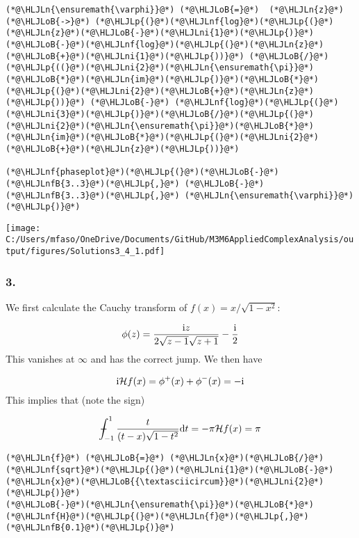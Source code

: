 \documentclass[12pt,a4paper]{article}
\newcommand{\HLJLn}[1]{#1}
\newcommand{\HLJLnf}[1]{\textcolor[RGB]{66,102,213}{#1}}
\newcommand{\HLJLnfB}[1]{\textcolor[RGB]{59,151,46}{#1}}
\newcommand{\HLJLni}[1]{\textcolor[RGB]{59,151,46}{#1}}
\newcommand{\HLJLoB}[1]{\textcolor[RGB]{102,102,102}{\textbf{#1}}}
\newcommand{\HLJLp}[1]{#1}
\def\D{ {\rm d} }
\def\I{ {\rm i} }
\def\HH{ {\cal H} }
\def\Xint#1{ \mathchoice
   {\XXint\displaystyle\textstyle{#1} }%
   {\XXint\textstyle\scriptstyle{#1} }%
   {\XXint\scriptstyle\scriptscriptstyle{#1} }%
   {\XXint\scriptscriptstyle\scriptscriptstyle{#1} }%
   \!\int}
\def\XXint#1#2#3{ {\setbox0=\hbox{$#1{#2#3}{\int}$}
     \vcenter{\hbox{$#2#3$}}\kern-.5\wd0} }
\def\dashint{\Xint-}
\def\dt{\D t}
\begin{document}
\begin{lstlisting}
(*@\HLJLn{\ensuremath{\varphi}}@*) (*@\HLJLoB{=}@*)  (*@\HLJLn{z}@*) (*@\HLJLoB{->}@*) (*@\HLJLp{(}@*)(*@\HLJLnf{log}@*)(*@\HLJLp{(}@*)(*@\HLJLn{z}@*)(*@\HLJLoB{-}@*)(*@\HLJLni{1}@*)(*@\HLJLp{)}@*)(*@\HLJLoB{-}@*)(*@\HLJLnf{log}@*)(*@\HLJLp{(}@*)(*@\HLJLn{z}@*)(*@\HLJLoB{+}@*)(*@\HLJLni{1}@*)(*@\HLJLp{))}@*) (*@\HLJLoB{/}@*) (*@\HLJLp{((}@*)(*@\HLJLni{2}@*)(*@\HLJLn{\ensuremath{\pi}}@*)(*@\HLJLoB{*}@*)(*@\HLJLn{im}@*)(*@\HLJLp{)}@*)(*@\HLJLoB{*}@*)(*@\HLJLp{(}@*)(*@\HLJLni{2}@*)(*@\HLJLoB{+}@*)(*@\HLJLn{z}@*)(*@\HLJLp{))}@*) (*@\HLJLoB{-}@*) (*@\HLJLnf{log}@*)(*@\HLJLp{(}@*)(*@\HLJLni{3}@*)(*@\HLJLp{)}@*)(*@\HLJLoB{/}@*)(*@\HLJLp{(}@*)(*@\HLJLni{2}@*)(*@\HLJLn{\ensuremath{\pi}}@*)(*@\HLJLoB{*}@*)(*@\HLJLn{im}@*)(*@\HLJLoB{*}@*)(*@\HLJLp{(}@*)(*@\HLJLni{2}@*)(*@\HLJLoB{+}@*)(*@\HLJLn{z}@*)(*@\HLJLp{))}@*)

(*@\HLJLnf{phaseplot}@*)(*@\HLJLp{(}@*)(*@\HLJLoB{-}@*)(*@\HLJLnfB{3..3}@*)(*@\HLJLp{,}@*) (*@\HLJLoB{-}@*)(*@\HLJLnfB{3..3}@*)(*@\HLJLp{,}@*) (*@\HLJLn{\ensuremath{\varphi}}@*)(*@\HLJLp{)}@*)
\end{lstlisting}

\texttt{[image: C:/Users/mfaso/OneDrive/Documents/GitHub/M3M6AppliedComplexAnalysis/output/figures/Solutions3\_4\_1.pdf]}

\subsubsection{3.}
We first calculate the Cauchy transform of $f(x) = x/\sqrt{1-x^2}$:

\[
\phi(z) = {\I z  \over 2 \sqrt{z -1} \sqrt{z+1}} - {\I \over 2}
\]
This vanishes at $\infty$ and has the correct jump. We then have

\[
\I{\cal H}f(x) = \phi^+(x) + \phi^-(x) = -\I
\]
This implies that (note the sign)

\[
\dashint_{-1}^1 {t \over (t-x) \sqrt{1-t^2}} \dt = -\pi \HH f(x) = \pi
\]

\begin{lstlisting}
(*@\HLJLn{f}@*) (*@\HLJLoB{=}@*) (*@\HLJLn{x}@*)(*@\HLJLoB{/}@*)(*@\HLJLnf{sqrt}@*)(*@\HLJLp{(}@*)(*@\HLJLni{1}@*)(*@\HLJLoB{-}@*)(*@\HLJLn{x}@*)(*@\HLJLoB{{\textasciicircum}}@*)(*@\HLJLni{2}@*)(*@\HLJLp{)}@*)
(*@\HLJLoB{-}@*)(*@\HLJLn{\ensuremath{\pi}}@*)(*@\HLJLoB{*}@*)(*@\HLJLnf{H}@*)(*@\HLJLp{(}@*)(*@\HLJLn{f}@*)(*@\HLJLp{,}@*) (*@\HLJLnfB{0.1}@*)(*@\HLJLp{)}@*)
\end{lstlisting}
\end{document}
